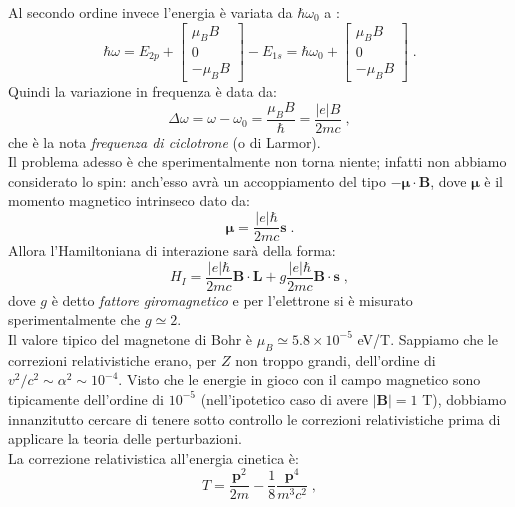 \documentclass[10pt,a4paper]{report}
\theoremstyle{definition}
\numberwithin{equation}{section}
\begin{document}
Al secondo ordine invece l'energia è variata da $\hbar\omega_0$ a :
\begin{equation}
\hbar \omega=E_{2p}+\left[
\begin{matrix}
\mu_BB \\
0 \\
-\mu_BB
\end{matrix}\right]-E_{1s}=\hbar\omega_0+\left[
\begin{matrix}
\mu_BB \\
0 \\
-\mu_BB
\end{matrix}\right]\;.
\end{equation}
Quindi la variazione in frequenza è data da:
\begin{equation}
\Delta\omega=\omega-\omega_0=\frac{\mu_BB}{\hbar}=\frac{|e|B}{2mc}\;,
\end{equation}
che è la nota \textit{frequenza di ciclotrone} (o di Larmor). \\
Il problema adesso è che sperimentalmente non torna niente; infatti non abbiamo considerato lo spin: anch'esso avrà un accoppiamento del tipo $-\boldsymbol{\mu}\cdot\mathbf{B}$, dove $\boldsymbol{\mu}$ è il momento magnetico intrinseco dato da:
\begin{equation}
\boldsymbol{\mu}=\frac{|e|\hbar}{2mc}\mathbf{s}\;.
\end{equation}
Allora l'Hamiltoniana di interazione sarà della forma:
\begin{equation}
H_I=\frac{|e|\hbar}{2mc}\mathbf{B}\cdot\mathbf{L}+g\frac{|e|\hbar}{2mc}\mathbf{B}\cdot\mathbf{s}\;,
\end{equation}
dove $g$ è detto \textit{fattore giromagnetico} e per l'elettrone si è misurato sperimentalmente che $g\simeq 2$. \\
Il valore tipico del magnetone di Bohr è $\mu_B\simeq 5.8\times 10^{-5}$ eV/T. Sappiamo che le correzioni relativistiche erano, per $Z$ non troppo grandi, dell'ordine di $v^2/c^2\sim \alpha^2\sim 10^{-4}$. Visto che le energie in gioco con il campo magnetico sono tipicamente dell'ordine di $10^{-5}$ (nell'ipotetico caso di avere $|\mathbf{B}|=1$ T), dobbiamo innanzitutto cercare di tenere sotto controllo le correzioni relativistiche prima di applicare la teoria delle perturbazioni. \\
La correzione relativistica all'energia cinetica è:
\begin{equation}
T=\frac{\mathbf{p}^2}{2m}-\frac{1}{8}\frac{\mathbf{p}^4}{m^3c^2}\;,
\end{equation}
\end{document}
